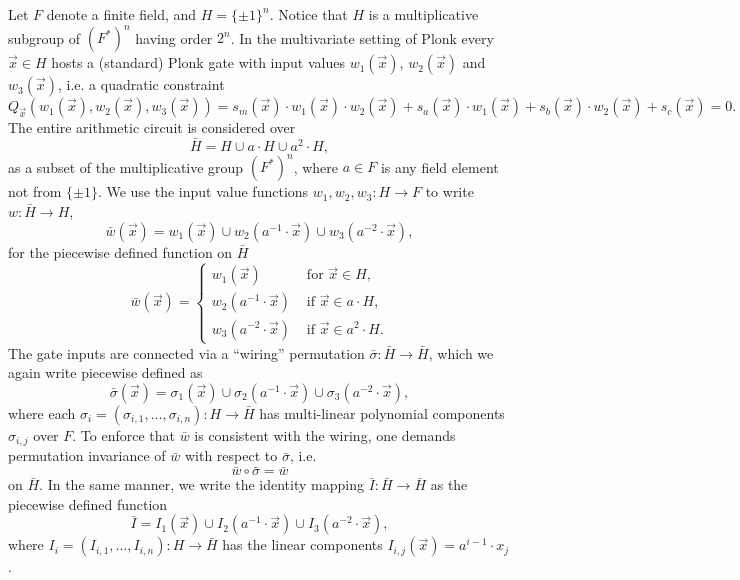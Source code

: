 \documentclass[11pt]{article}
\theoremstyle{definition}
\theoremstyle{remark}
\begin{document}
Let $F$ denote a finite field, and $H= \{\pm 1\}^n$. 
Notice that $H$ is a multiplicative subgroup of $(F^*)^n$ having order $2^n$. 
%
In the multivariate setting of Plonk  every $\vec x \in H$ hosts a (standard) Plonk gate with input values $w_1(\vec x)$, $w_2(\vec x)$ and $w_3(\vec x)$, i.e. a quadratic constraint
\begin{equation}
\label{e:QuadraticConstraint}
Q_{\vec x}(w_1(\vec x), w_2(\vec x), w_3(\vec x) ) = s_m(\vec x)\cdot w_1(\vec x) \cdot w_2(\vec x) + s_a(\vec x) \cdot w_1(\vec x) + s_b(\vec x)\cdot w_2(\vec x) + s_c(\vec x) = 0.
\end{equation}
The entire arithmetic circuit is considered over
\begin{equation}
\bar H = H\cup a\cdot H \cup a^2 \cdot H,
\end{equation}
as a subset of the multiplicative group $(F^*)^n$, where $a\in F$ is any field element not from $\{\pm 1\}$.
We use the input value functions $w_1, w_2, w_3: H\longrightarrow F$ to write $w: \bar H\longrightarrow H$,  
\begin{equation}
\bar w(\vec x) = w_1(\vec x) \cup w_2( a^{-1}\cdot \vec x) \cup w_3(a^{-2}\cdot \vec x), 
\end{equation}
for the piecewise defined function on $\bar H$
\[
\bar w(\vec x) = 
\begin{cases}
w_1(\vec x) & \text{ for }\vec x\in H,
\\
w_2(a^{-1}\cdot\vec x) & \text{ if } \vec x \in a\cdot H,
\\
w_3(a^{-2}\cdot\vec x) & \text{ if } \vec x \in a^2\cdot H.
\end{cases}
\]
The gate inputs are connected via a ``wiring'' permutation $\bar\sigma: \bar H\rightarrow \bar H$, which we again write piecewise defined as 
\begin{equation}
\bar\sigma(\vec x) = \sigma_1(\vec x) \cup \sigma_2(a^{-1}\cdot \vec x) \cup \sigma_3(a^{-2}\cdot \vec x),
\end{equation}
where each $\sigma_i = (\sigma_{i,1}, \ldots, \sigma_{i,n}): H \longrightarrow \bar H$ has multi-linear polynomial components $\sigma_{i,j}$ over $F$.
To enforce that $\bar w$ is consistent with the wiring, one demands permutation invariance of $\bar w$ with respect to $\bar\sigma$, i.e.
\begin{equation}
\label{e:PermutationInvariance}
\bar w \circ \bar\sigma = \bar w
\end{equation}
on $\bar H$.
In the same manner, we write the identity mapping $\bar I: \bar H\longrightarrow \bar H$ as the piecewise defined function
\[
\bar I = I_1(\vec x) \cup I_2(a^{-1}\cdot \vec x) \cup I_3(a^{-2}\cdot \vec x),
\]
where $I_i = (I_{i,1},\ldots, I_{i,n}): H\rightarrow \bar H$ has the linear components $I_{i,j}(\vec x) = a^{i-1}\cdot  x_j$.
\end{document}
